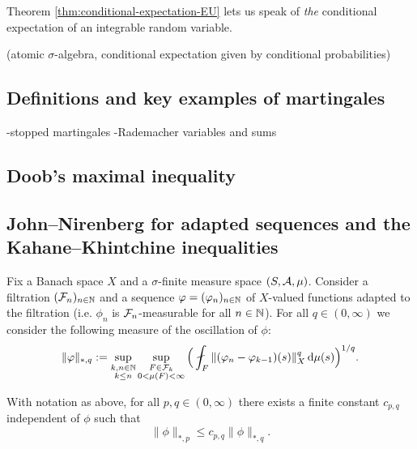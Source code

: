 Theorem \ref{thm:conditional-expectation-EU} lets us speak of \emph{the} conditional expectation of an integrable random variable.

\begin{example}
  (atomic $\sigma$-algebra, conditional expectation given by conditional probabilities)
\end{example}




\subsection{Definitions and key examples of martingales}

-stopped martingales
-Rademacher variables and sums

\subsection{Doob's maximal inequality}

\subsection{John--Nirenberg for adapted sequences and the Kahane--Khintchine inequalities}

Fix a Banach space $X$ and a $\sigma$-finite measure space $(S,\mathcal{A},\mu)$.
Consider a filtration $(\mathcal{F}_n)_{n \in \mathbb{N}}$ and a sequence $\varphi = (\varphi_n)_{n \in \mathbb{N}}$ of $X$-valued functions adapted to the filtration (i.e. $\phi_n$ is $\mathcal{F}_n$-measurable for all $n \in \mathbb{N}$).
For all $q \in (0,\infty)$ we consider the following measure of the oscillation of $\phi$:
\begin{equation*}
    \|\phi\|_{*,q} := \sup_{\substack{k,n \in \N \\ k \leq n}} \sup_{\substack{F \in \mc{F}_k \\ 0 < \mu(F) < \infty}} \Big( \fint_{F} \|(\phi_n - \phi_{k-1})(s)\|_{X}^{q} \, \dd\mu(s)\Big)^{1/q} .
\end{equation*}


\begin{thm}\label{thm:jn-adapted-sequences}
  With notation as above, for all $p,q \in (0,\infty)$ there exists a finite constant $c_{p,q}$ independent of $\phi$ such that
  \begin{equation*}
    \|\phi\|_{*,p} \leq c_{p,q} \|\phi\|_{*,q}.
  \end{equation*}
\end{thm}


